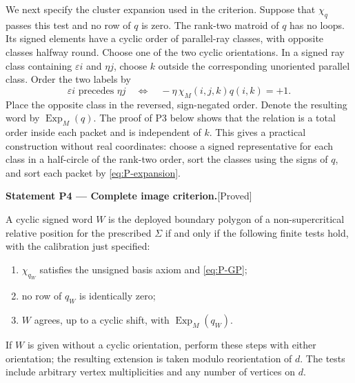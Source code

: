 \documentclass[11pt,a4paper]{article}
\newenvironment{resultenv}[3]{\par\medskip\phantomsection\label{#1}\noindent\textbf{Statement #1 --- #3.}\quad\textsf{[#2]}\par\smallskip\noindent\ignorespaces}{\par\medskip}
\begin{document}
We next specify the cluster expansion used in the criterion.  Suppose
that $\chi_q$ passes this test and no row of $q$ is zero.  The rank-two
matroid of $q$ has no loops.  Its signed elements have a cyclic order of
parallel-ray classes, with opposite classes halfway round.  Choose one
of the two cyclic orientations.  In a signed ray class containing
$\varepsilon i$ and $\eta j$, choose $k$ outside the corresponding
unoriented parallel class.  Order the two labels by
\begin{equation}
 \varepsilon i \text{ precedes }\eta j
 \quad\Longleftrightarrow\quad
 -\eta\,\chi_M(i,j,k)q(i,k)=+1.                         \label{eq:P-expansion}
\end{equation}
Place the opposite class in the reversed, sign-negated order.  Denote
the resulting word by $\operatorname{Exp}_M(q)$.  The proof of P3 below
shows that the relation is a total order inside each packet and is
independent of $k$.  This gives a practical construction without real
coordinates: choose a signed representative for each class in a
half-circle of the rank-two order, sort the classes using the signs of
$q$, and sort each packet by \eqref{eq:P-expansion}.

\begin{resultenv}{P4}{Proved}{Complete image criterion}
A cyclic signed word $W$ is the deployed boundary polygon of a
non-supercritical relative position for the prescribed $\Sigma$ if and
only if the following finite tests hold, with the calibration just
specified:
\begin{enumerate}
 \item $\chi_{q_W}$ satisfies the unsigned basis axiom and
       \eqref{eq:P-GP};
 \item no row of $q_W$ is identically zero;
 \item $W$ agrees, up to a cyclic shift, with
       $\operatorname{Exp}_M(q_W)$.
\end{enumerate}
If $W$ is given without a cyclic orientation, perform these steps with
either orientation; the resulting extension is taken modulo
reorientation of $d$.  The tests include arbitrary vertex
multiplicities and any number of vertices on $d$.
\end{resultenv}
\end{document}
